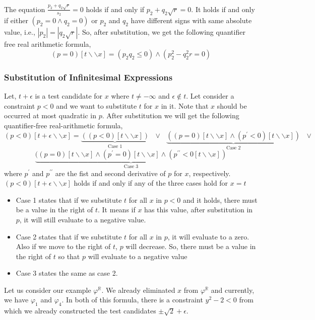 The equation $\frac{p_{2}+q_{2}\sqrt{r}}{s_{2}} = 0$ holds if and only if $p_{2}+q_{2}\sqrt{r} = 0$. It holds if and only if either $(p_{2} = 0\wedge q_{2} = 0)$ or $p_{2}$ and $q_{2}$ have different signs with same absolute value, i.e., $|p_{2}|=|q_{2}\sqrt{r}|$. So, after substitution, we get the following quantifier free real arithmetic formula,
$$ (p = 0)[t\backslash\backslash x] = (p_{2}q_{2}\leq 0) \wedge (p_{2}^{2} - q_{2}^{2} r = 0) $$
\subsubsection{Substitution of Infinitesimal Expressions}
Let, $t+\epsilon$ is a test candidate for $x$ where $t\neq - \infty$ and $\epsilon \notin t$. Let consider a constraint $p<0$ and we want to substitute $t$ for $x$ in it. Note that $x$ should be occurred at most quadratic in $p$. After substitution we will get the following quantifier-free real-arithmetic formula,
$$(p<0)[t+\epsilon\backslash\backslash x]=\underbrace{((p<0)[t\backslash\backslash x])}\limits_{\text{Case 1}} \text{ }\vee\text{ }\underbrace{((p=0)[t\backslash\backslash x]\wedge(p^{\prime}<0)[t\backslash\backslash x])}\limits_{\text{Case 2}}\text{ }\vee$$
$$\underbrace{((p=0)[t\backslash\backslash x]\wedge(p^{\prime}=0)[t\backslash\backslash x]\wedge (p^{\prime\prime}<0[t\backslash\backslash x])}\limits_{\text{Case 3}} $$
where $p^{\prime}$ and $p^{\prime\prime}$ are the fist and second derivative of $p$ for $x$, respectively. $(p<0)[t+\epsilon\backslash\backslash x]$ holds if and only if any of the three cases hold for $x=t$
\begin{itemize}
	\item Case 1 states that if we substitute $t$ for all $x$ in $p<0$ and it holds, there must be a value in the right of $t$. It means if $x$ has this value, after substitution in $p$, it will still evaluate to a negative value.
	\item Case 2 states that if we substitute $t$ for all $x$ in $p$, it will evaluate to a zero. Also if we move to the right of $t$, $p$ will decrease. So, there must be a value in the right of $t$ so that $p$ will evaluate to a negative value
	\item Case 3 states the same as case 2.
\end{itemize}

	Let us consider our example $\varphi^\mathbb{R}$. We already eliminated $x$ from $\varphi^\mathbb{R}$ and currently, we have $\varphi_{1}$ and $\varphi_{4}$. In both of this formula, there is a constraint $y^{2}-2<0$ from which we already constructed the test candidates $\pm\sqrt{2}+\epsilon$.
